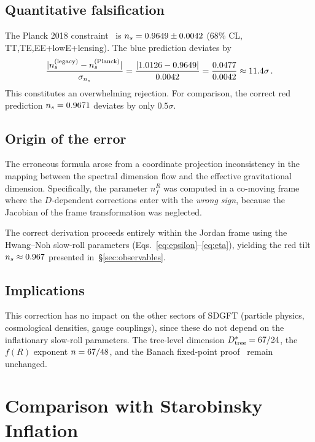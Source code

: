 \documentclass[a4paper,11pt]{article}
\begin{document}
\subsection{Quantitative falsification}

The Planck 2018 constraint~\cite{Planck2018_inflation} is
$n_s = 0.9649 \pm 0.0042$ (68\% CL, TT,TE,EE+lowE+lensing).
The blue prediction deviates by
\begin{equation}
  \frac{\lvert n_s^{(\mathrm{legacy})} - n_s^{(\mathrm{Planck})}
        \rvert}
       {\sigma_{n_s}}
    = \frac{\lvert 1.0126 - 0.9649\rvert}{0.0042}
    = \frac{0.0477}{0.0042}
    \approx 11.4\sigma\,.
  \label{eq:blue_rejection}
\end{equation}
This constitutes an overwhelming rejection.  For comparison, the
correct red prediction $n_s = 0.9671$ deviates by only
$0.5\sigma$.

\subsection{Origin of the error}

The erroneous formula arose from a coordinate projection
inconsistency in the mapping between the spectral dimension flow
and the effective gravitational dimension.  Specifically, the
parameter $n^R_f$ was computed in a co-moving frame where the
$D$-dependent corrections enter with the \emph{wrong sign},
because the Jacobian of the frame transformation was neglected.

The correct derivation proceeds entirely within the Jordan frame
using the Hwang--Noh slow-roll parameters
(Eqs.~\ref{eq:epsilon}--\ref{eq:eta}), yielding the red tilt
$n_s \approx 0.967$ presented in~\S\ref{sec:observables}.

\subsection{Implications}

This correction has no impact on the other sectors of SDGFT (particle
physics, cosmological densities, gauge couplings), since these do not
depend on the inflationary slow-roll parameters.  The tree-level
dimension $D^{*}_{\mathrm{tree}} = 67/24$, the $f(R)$ exponent $n = 67/48$,
and the Banach fixed-point proof~\cite{Goldstein_Paper04} remain
unchanged.

\section{Comparison with Starobinsky Inflation}
\label{sec:starobinsky}
\end{document}
